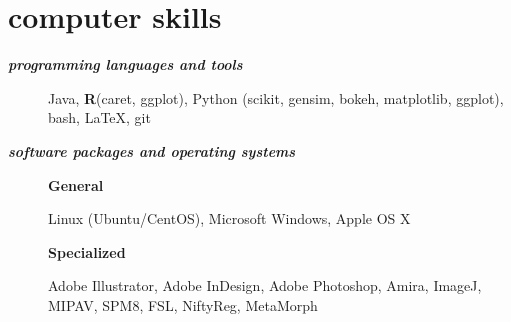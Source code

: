 \documentclass[]{friggeri-cv} %
\begin{document}
\section{computer skills}
\begin{description}
   \item[\textbf{\emph{programming languages and tools}}] \hfill

	 Java, \textbf{R}(caret, ggplot), Python (scikit, gensim, bokeh, matplotlib, ggplot), bash, \LaTeX, git
   \item[\textbf{\emph{software packages and operating systems}}] \hfill

	    \textbf{General} \hfill

		Linux (Ubuntu/CentOS), Microsoft Windows, Apple OS X 

	    \textbf{Specialized}  \hfill

	    Adobe Illustrator, Adobe InDesign, Adobe Photoshop, Amira, ImageJ, MIPAV, SPM8, FSL, NiftyReg, MetaMorph 
\end{description}



%

\end{document}
